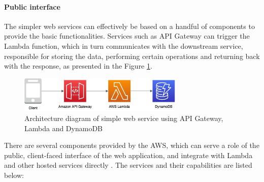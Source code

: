 \paragraph{Public interface} \label{chapter:public-interfaces}

The simpler web services can effectively be based on a handful of components to provide the basic functionalities. Services such as API Gateway can trigger the Lambda function, which in turn communicates with the downstream service, responsible for storing the data, performing certain operations and returning back with the response, as presented in the Figure \ref{fig:simple-web-service-diagram}.

\begin{figure}[H]
   \centering
   \includegraphics[width=0.7\textwidth]{assets/04-serverless-for-web-apps/simpleWebService.png}
   \caption{Architecture diagram of simple web service using API Gateway, Lambda and DynamoDB}
   \label{fig:simple-web-service-diagram}
\end{figure}

There are several components provided by the AWS, which can serve a role of the public, client-faced interface of the web application, and integrate with Lambda and other hosted services directly \cite{AWSReinventBuildingMicroservicesWithAWSLambda}. The services and their capabilities are listed below:

